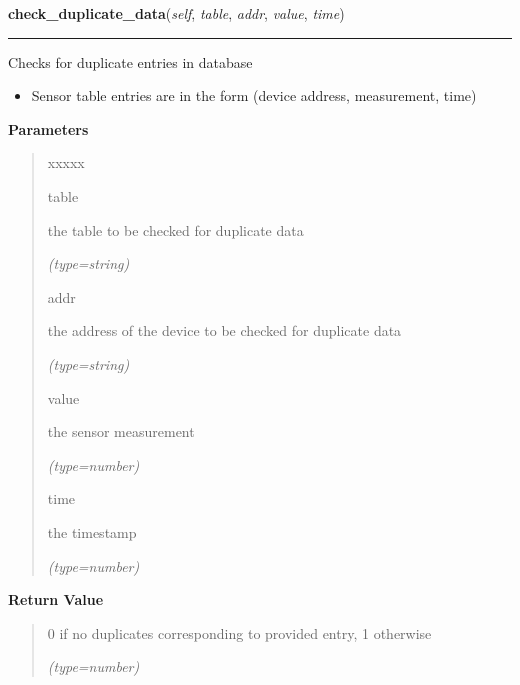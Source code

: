 \hspace{.8\funcindent}\begin{boxedminipage}{\funcwidth}

    \raggedright \textbf{check\_duplicate\_data}(\textit{self}, \textit{table}, \textit{addr}, \textit{value}, \textit{time})

    \vspace{-1.5ex}

    \rule{\textwidth}{0.5\fboxrule}
\setlength{\parskip}{2ex}
    Checks for duplicate entries in database

    \begin{itemize}
    \setlength{\parskip}{0.6ex}
      \item Sensor table entries are in the form (device address, measurement, 
        time)

    \end{itemize}

\setlength{\parskip}{1ex}
      \textbf{Parameters}
      \vspace{-1ex}

      \begin{quote}
        \begin{Ventry}{xxxxx}

          \item[table]

          the table to be checked for duplicate data

            {\it (type=string)}

          \item[addr]

          the address of the device to be checked for duplicate data

            {\it (type=string)}

          \item[value]

          the sensor measurement

            {\it (type=number)}

          \item[time]

          the timestamp

            {\it (type=number)}

        \end{Ventry}

      \end{quote}

      \textbf{Return Value}
    \vspace{-1ex}

      \begin{quote}
      0 if no duplicates corresponding to provided entry, 1 otherwise

      {\it (type=number)}

      \end{quote}

    \end{boxedminipage}

